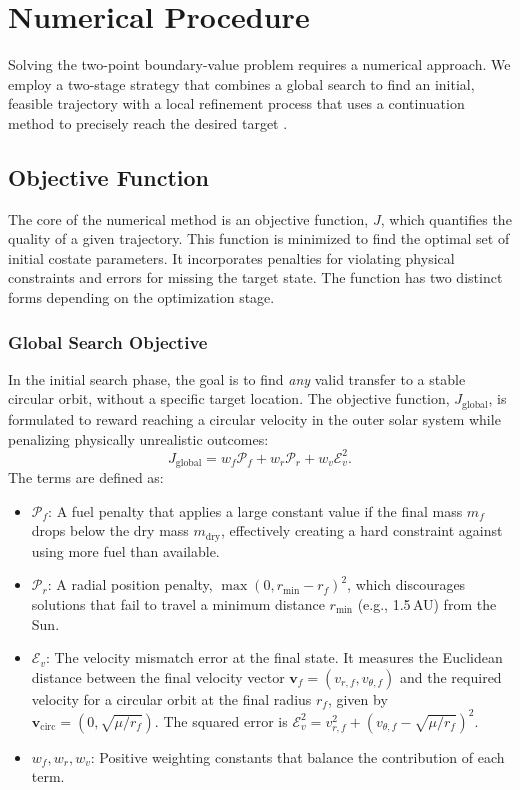 \documentclass[journal, a4paper]{IEEEtran}
\begin{document}
\section{Numerical Procedure}
Solving the two-point boundary-value problem requires a numerical approach. We employ a two-stage strategy that combines a global search to find an initial, feasible trajectory with a local refinement process that uses a continuation method to precisely reach the desired target \cite{Fogel2020,DiPasquale2024}.

\subsection{Objective Function}
The core of the numerical method is an objective function, $J$, which quantifies the quality of a given trajectory. This function is minimized to find the optimal set of initial costate parameters. It incorporates penalties for violating physical constraints and errors for missing the target state. The function has two distinct forms depending on the optimization stage.

\subsubsection{Global Search Objective}
In the initial search phase, the goal is to find \emph{any} valid transfer to a stable circular orbit, without a specific target location. The objective function, $J_\text{global}$, is formulated to reward reaching a circular velocity in the outer solar system while penalizing physically unrealistic outcomes:
\begin{equation}
    J_\text{global} = w_f \mathcal{P}_f + w_r \mathcal{P}_r + w_v \mathcal{E}_v^2.
    \label{eq:obj_global}
\end{equation}
The terms are defined as:
\begin{itemize}
    \item $\mathcal{P}_f$: A fuel penalty that applies a large constant value if the final mass $m_f$ drops below the dry mass $m_\text{dry}$, effectively creating a hard constraint against using more fuel than available.
    \item $\mathcal{P}_r$: A radial position penalty, $\max(0, r_\text{min} - r_f)^2$, which discourages solutions that fail to travel a minimum distance $r_\text{min}$ (e.g., 1.5\,AU) from the Sun.
    \item $\mathcal{E}_v$: The velocity mismatch error at the final state. It measures the Euclidean distance between the final velocity vector $\mathbf{v}_f=(v_{r,f}, v_{\theta,f})$ and the required velocity for a circular orbit at the final radius $r_f$, given by $\mathbf{v}_\text{circ}=(0, \sqrt{\mu/r_f})$. The squared error is $\mathcal{E}_v^2 = v_{r,f}^2 + (v_{\theta,f} - \sqrt{\mu/r_f})^2$.
    \item $w_f, w_r, w_v$: Positive weighting constants that balance the contribution of each term.
\end{itemize}
\end{document}
